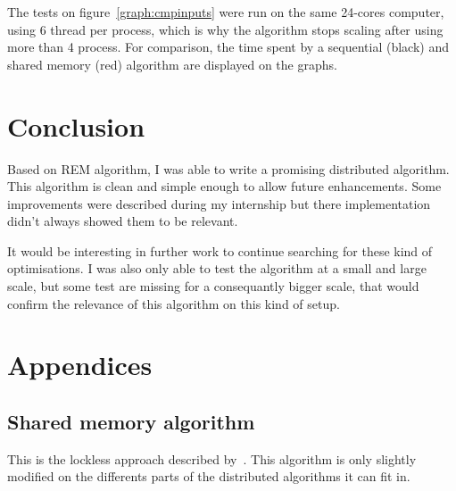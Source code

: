 \documentclass[12px]{article}
\begin{document}
      The tests on figure~\ref{graph:cmpinputs} were run on the same 24-cores computer, using 6 thread per process, which is why the algorithm stops scaling after using more than 4 process.
      For comparison, the time spent by a sequential (black) and shared memory (red) algorithm are displayed on the graphs.


  \section{Conclusion}
    Based on REM algorithm, I was able to write a promising distributed algorithm.
    This algorithm is clean and simple enough to allow future enhancements.
    Some improvements were described during my internship but there implementation didn't always showed them to be relevant.

    It would be interesting in further work to continue searching for these kind of optimisations.
    I was also only able to test the algorithm at a small and large scale, but some test are missing for a consequantly bigger scale, that would confirm the relevance of this algorithm on this kind of setup.


  \section{Appendices}
    \subsection{Shared memory algorithm}
      This is the lockless approach described by~.
      This algorithm is only slightly modified on the differents parts of the distributed algorithms it can fit in.
\end{document}
